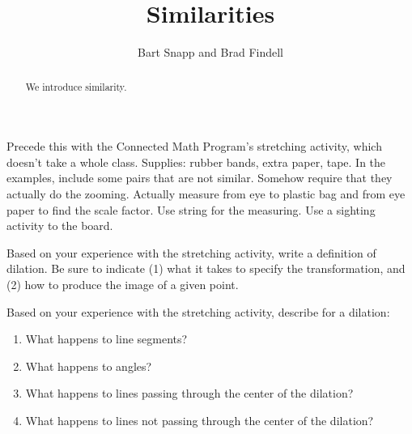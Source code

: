 \documentclass[nooutcomes]{ximera}
\title{Similarities}
\author{Bart Snapp and Brad Findell}
\begin{document}
\begin{abstract}
  We introduce similarity.
\end{abstract}
\maketitle

\begin{teachingnote}
Precede this with the Connected Math Program's stretching activity, which doesn't take a whole class.  
Supplies:  rubber bands, extra paper, tape.   
In the examples, include some pairs that are not similar.  Somehow require that they actually do the zooming.  Actually measure from eye to plastic bag and from eye paper to find the scale factor.  Use string for the measuring.  Use a sighting activity to the board.
\end{teachingnote}

\begin{problem}
Based on your experience with the stretching activity, write a definition of dilation.  Be sure to indicate (1) what it takes to specify the transformation, and (2) how to produce the image of a given point.  
\vspace{0.6in}
\end{problem}

\begin{problem}
Based on your experience with the stretching activity, describe for a dilation: 
\begin{enumerate}
\item What happens to line segments? 
\vspace{0.2in}
\item What happens to angles?  
\vspace{0.2in}
\item What happens to lines passing through the center of the dilation?
\vspace{0.2in}
\item What happens to lines not passing through the center of the dilation?
\vspace{0.2in}
\end{enumerate}
\end{problem}

\end{document}
